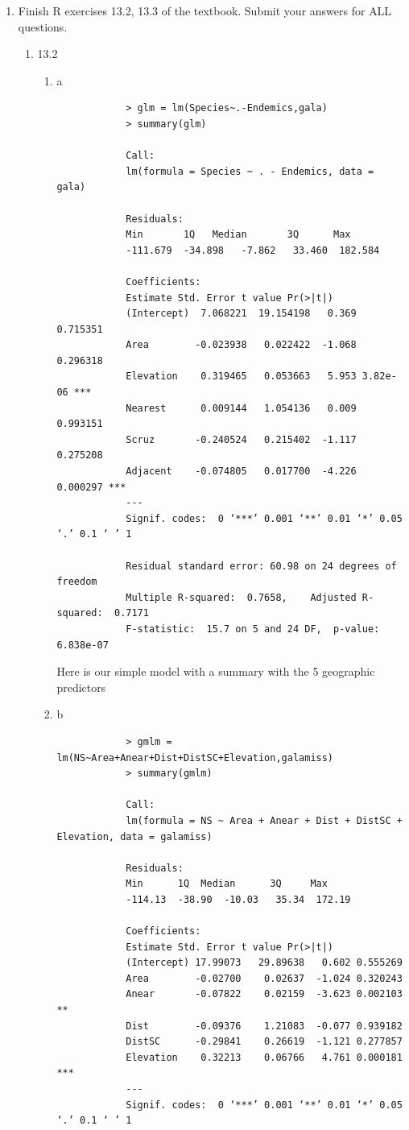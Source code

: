 \documentclass[11pt]{article}
\begin{document}
\begin{enumerate}
\begin{enumerate}
\begin{enumerate}
\begin{figure}[H]
			\caption[idk]{A plot of the coefficients of PC1 against PC2}
			\label{idk}
		\end{figure}
		I suppose we can see some orthogonality / differences between components , as we would expect.
	\end{enumerate}
\end{enumerate}
\item  Finish R exercises 13.2, 13.3 of the textbook. Submit your
answers for {\color{red}ALL} questions. 
\begin{enumerate}
	\item 13.2
	\begin{enumerate}
		\item a
		\begin{verbatim}
			> glm = lm(Species~.-Endemics,gala)
			> summary(glm)
			
			Call:
			lm(formula = Species ~ . - Endemics, data = gala)
			
			Residuals:
			Min       1Q   Median       3Q      Max 
			-111.679  -34.898   -7.862   33.460  182.584 
			
			Coefficients:
			Estimate Std. Error t value Pr(>|t|)    
			(Intercept)  7.068221  19.154198   0.369 0.715351    
			Area        -0.023938   0.022422  -1.068 0.296318    
			Elevation    0.319465   0.053663   5.953 3.82e-06 ***
			Nearest      0.009144   1.054136   0.009 0.993151    
			Scruz       -0.240524   0.215402  -1.117 0.275208    
			Adjacent    -0.074805   0.017700  -4.226 0.000297 ***
			---
			Signif. codes:  0 ‘***’ 0.001 ‘**’ 0.01 ‘*’ 0.05 ‘.’ 0.1 ‘ ’ 1
			
			Residual standard error: 60.98 on 24 degrees of freedom
			Multiple R-squared:  0.7658,	Adjusted R-squared:  0.7171 
			F-statistic:  15.7 on 5 and 24 DF,  p-value: 6.838e-07
		\end{verbatim}
		Here is our simple model with a summary with the 5 geographic predictors
		\item b
		\begin{verbatim}
			> gmlm = lm(NS~Area+Anear+Dist+DistSC+Elevation,galamiss)
			> summary(gmlm)
			
			Call:
			lm(formula = NS ~ Area + Anear + Dist + DistSC + Elevation, data = galamiss)
			
			Residuals:
			Min      1Q  Median      3Q     Max 
			-114.13  -38.90  -10.03   35.34  172.19 
			
			Coefficients:
			Estimate Std. Error t value Pr(>|t|)    
			(Intercept) 17.99073   29.89638   0.602 0.555269    
			Area        -0.02700    0.02637  -1.024 0.320243    
			Anear       -0.07822    0.02159  -3.623 0.002103 ** 
			Dist        -0.09376    1.21083  -0.077 0.939182    
			DistSC      -0.29841    0.26619  -1.121 0.277857    
			Elevation    0.32213    0.06766   4.761 0.000181 ***
			---
			Signif. codes:  0 ‘***’ 0.001 ‘**’ 0.01 ‘*’ 0.05 ‘.’ 0.1 ‘ ’ 1
			

\end{verbatim}
\end{enumerate}
\end{enumerate}
\end{enumerate}
\end{document}
